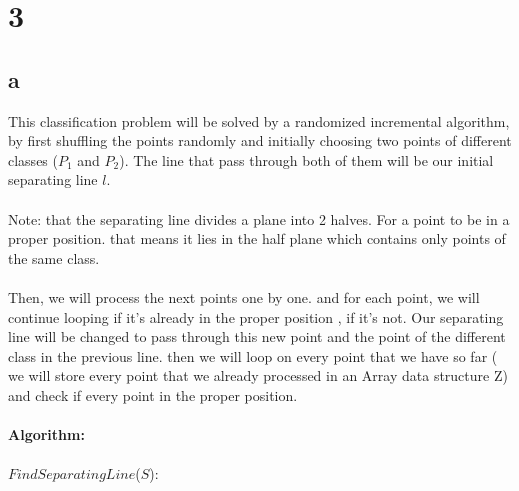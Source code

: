 
\section*{3}
\subsection*{a}

This classification problem will be solved by a randomized incremental algorithm, by first shuffling the points randomly and initially choosing two points of different classes 
($P_1$ and $P_2$). The line that pass through both  of them will be our initial separating line $l$. \\
\\
Note: that the separating line divides a plane into 2 halves. For a point to be in a proper position. that means it lies in the half plane which contains only points of the same class. \\
\\
Then, we will process the next points one by one. and for each point, we will continue looping if it's already in the proper position , if it's not. Our separating line will be changed to pass through this new point and the point of the different class in the previous line. then we will loop on every point that we have so far ( we will store every point that we already processed in an Array data structure Z) and check if every point in the proper position. 
\\
\\
\textbf{Algorithm:}\\
\\
$FindSeparatingLine$($S$):
